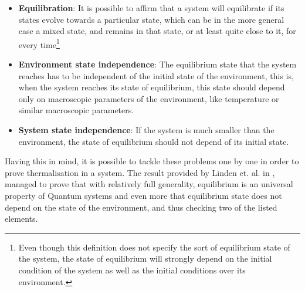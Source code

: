 \begin{itemize}
\item \textbf{Equilibration}: It is possible to affirm that a system will equilibrate if its states evolve towards a particular state, which can be in the more general case a mixed state, and remains in that state, or at least quite close to it, for every time\footnote{Even though this definition does not specify the sort of equilibrium state of the system, the state of equilibrium will strongly depend on the initial condition of the system as well as the initial conditions over its environment. }
\item \textbf{Environment state independence}: The equilibrium state that the system reaches has to be independent of the initial state of the environment, this is, when the system reaches its state of equilibrium, this state should depend only on macroscopic parameters of the environment, like temperature or similar macroscopic parameters.
\item \textbf{System state independence}: If the system is much smaller than the environment, the state of equilibrium should not depend of its initial state.
\end{itemize}
Having this in mind, it is possible to tackle these problems one by one in order to prove thermalisation in a system. The result provided by Linden et. al. in \cite{linden_quantum_2009}, managed to prove that with relatively full generality, equilibrium is an universal property of Quantum systems and even more that equilibrium state does not depend on the state of the environment, and thus checking two of the listed elements.\\

